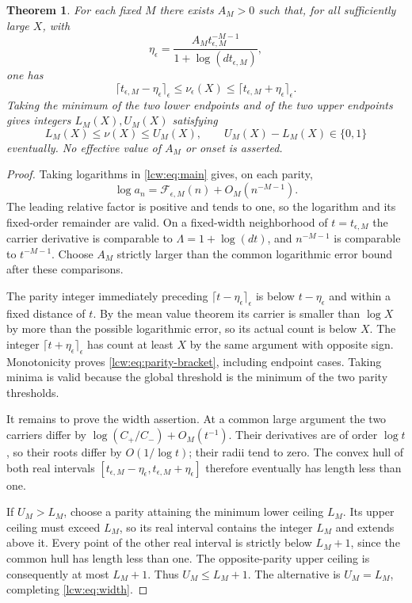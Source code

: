 \documentclass[11pt,letterpaper]{article}
\newtheorem{theorem}{Theorem}[section]
\theoremstyle{remark}\newtheorem{remark}[theorem]{Remark}
\newcommand{\ceilp}[2]{\lceil #1\rceil_{#2}}
\begin{document}
\begin{theorem}\label{lcw:thm:inverse}
For each fixed $M$ there exists $A_M>0$ such that, for all sufficiently large $X$, with
\begin{equation}\label{lcw:eq:eta}
 \eta_\epsilon=
 \frac{A_M t_{\epsilon,M}^{-M-1}}{1+\log(dt_{\epsilon,M})},
\end{equation}
one has
\begin{equation}\label{lcw:eq:parity-bracket}
 \ceilp{t_{\epsilon,M}-\eta_\epsilon}{\epsilon}
 \le \nu_\epsilon(X)\le
 \ceilp{t_{\epsilon,M}+\eta_\epsilon}{\epsilon}.
\end{equation}
Taking the minimum of the two lower endpoints and of the two upper endpoints gives integers $L_M(X),U_M(X)$ satisfying
\begin{equation}\label{lcw:eq:width}
 L_M(X)\le\nu(X)\le U_M(X),\qquad U_M(X)-L_M(X)\in\{0,1\}
\end{equation}
eventually. No effective value of $A_M$ or onset is asserted.
\end{theorem}
\begin{proof}
Taking logarithms in \eqref{lcw:eq:main} gives, on each parity,
\[
 \log a_n=\mathcal F_{\epsilon,M}(n)+O_M(n^{-M-1}).
\]
The leading relative factor is positive and tends to one, so the logarithm and its fixed-order remainder are valid. On a fixed-width neighborhood of $t=t_{\epsilon,M}$ the carrier derivative is comparable to $\Lambda=1+\log(dt)$, and $n^{-M-1}$ is comparable to $t^{-M-1}$. Choose $A_M$ strictly larger than the common logarithmic error bound after these comparisons.

The parity integer immediately preceding $\ceilp{t-\eta_\epsilon}{\epsilon}$ is below $t-\eta_\epsilon$ and within a fixed distance of $t$. By the mean value theorem its carrier is smaller than $\log X$ by more than the possible logarithmic error, so its actual count is below $X$. The integer $\ceilp{t+\eta_\epsilon}{\epsilon}$ has count at least $X$ by the same argument with opposite sign. Monotonicity proves \eqref{lcw:eq:parity-bracket}, including endpoint cases. Taking minima is valid because the global threshold is the minimum of the two parity thresholds.

It remains to prove the width assertion. At a common large argument the two carriers differ by $\log(C_+/C_-)+O_M(t^{-1})$. Their derivatives are of order $\log t$, so their roots differ by $O(1/\log t)$; their radii tend to zero. The convex hull of both real intervals
$[t_{\epsilon,M}-\eta_\epsilon,t_{\epsilon,M}+\eta_\epsilon]$
therefore eventually has length less than one.

If $U_M>L_M$, choose a parity attaining the minimum lower ceiling $L_M$. Its upper ceiling must exceed $L_M$, so its real interval contains the integer $L_M$ and extends above it. Every point of the other real interval is strictly below $L_M+1$, since the common hull has length less than one. The opposite-parity upper ceiling is consequently at most $L_M+1$. Thus $U_M\le L_M+1$. The alternative is $U_M=L_M$, completing \eqref{lcw:eq:width}.
\end{proof}
\end{document}
